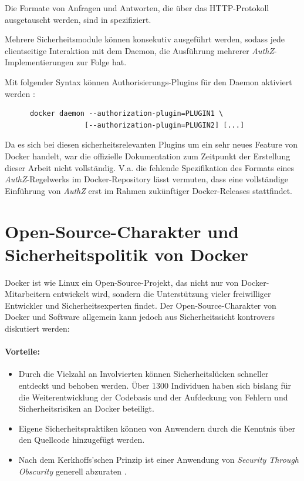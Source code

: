 \documentclass[../main.tex]{subfiles}
\begin{document}
    Die Formate von Anfragen und Antworten, die über das HTTP-Protokoll ausgetauscht werden, sind in \cite{githubAuthZExtended} spezifiziert.

    Mehrere Sicherheitsmodule können konsekutiv ausgeführt werden, sodass jede clientseitige Interaktion mit dem Daemon, die Ausführung mehrerer \emph{AuthZ}-Implementierungen zur Folge hat.

    Mit folgender Syntax können Authorisierungs-Plugins für den Daemon aktiviert werden \cite{githubAuthZExtended}:

    \begin{lstlisting}
      docker daemon --authorization-plugin=PLUGIN1 \
                   [--authorization-plugin=PLUGIN2] [...]
    \end{lstlisting}

    Da es sich bei diesen sicherheitsrelevanten Plugins um ein sehr neues Feature von Docker handelt, war die offizielle Dokumentation zum Zeitpunkt der Erstellung dieser Arbeit nicht vollständig. V.a. die fehlende Spezifikation des Formats eines \emph{AuthZ}-Regelwerks im Docker-Repository lässt vermuten, dass eine vollständige Einführung von \emph{AuthZ} erst im Rahmen zukünftiger Docker-Releases stattfindet.

  \section{Open-Source-Charakter und Sicherheitspolitik von Docker}
  \label{opensource}
    Docker ist wie Linux ein Open-Source-Projekt, das nicht nur von Docker-Mitarbeitern entwickelt wird, sondern die Unterstützung vieler freiwilliger Entwickler und Sicherheitsexperten findet. Der Open-Source-Charakter von Docker und Software allgemein kann jedoch aus Sicherheitssicht kontrovers diskutiert werden:

    \paragraph{Vorteile:}
    \begin{itemize}
      \item Durch die Vielzahl an Involvierten können Sicherheitslücken schneller entdeckt und behoben werden. Über 1300 Individuen haben sich bislang für die Weiterentwicklung der Codebasis und der Aufdeckung von Fehlern und Sicherheitsrisiken an Docker beteiligt.
      \item Eigene Sicherheitspraktiken können von Anwendern durch die Kenntnis über den Quellcode hinzugefügt werden.
      \item Nach dem Kerkhoffs'schen Prinzip ist einer Anwendung von \emph{Security Through Obscurity} generell abzuraten \cite[S.15]{nist}.
    \end{itemize}
\end{document}
